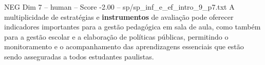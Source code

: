 \begin{textsample}{NEG Dim 7 – human – Score -2.00 – sp/sp\_inf\_e\_ef\_intro\_9\_p7.txt}  \label{ex:f7_neg_004}
A multiplicidade de estratégias e \textbf{instrumentos} de avaliação pode oferecer indicadores importantes para a gestão pedagógica em sala de aula, como também para a gestão escolar e a elaboração de políticas públicas, permitindo o monitoramento e o acompanhamento das aprendizagens essenciais que estão sendo asseguradas a todos estudantes paulistas.

\end{textsample}
